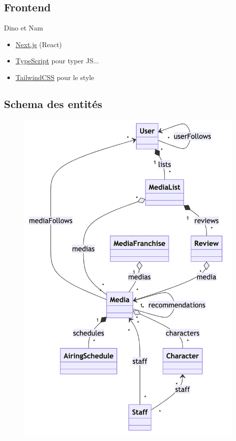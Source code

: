 \documentclass[headings=standardclasses,parskip=half]{scrartcl}
\begin{document}
\subsection*{Frontend}

Dino et Nam

\begin{itemize}
    \item \href{https://nextjs.org}{Next.js} (React)
    \item \href{https://www.typescriptlang.org}{TypeScript} pour typer JS...
    \item \href{https://tailwindcss.com}{TailwindCSS} pour le style
\end{itemize}

\subsection*{Schema des entités}

\begin{figure}[h]
    \centering
    \includegraphics[height=0.6\textheight]{entities.png}
\end{figure}
\end{document}
